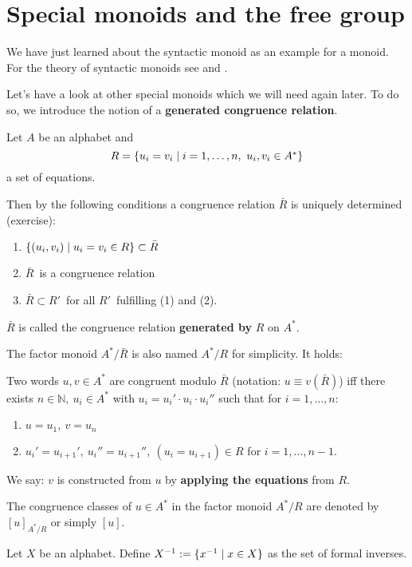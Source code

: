 \section{Special monoids and the free group}

We have just learned about the syntactic monoid as an example for a monoid. For
the theory of syntactic monoids see \cite{Salomaa} and \cite{Perrot}.

Let's have a look at other special monoids which we will need again later. To do
so, we introduce the notion of a {\bf generated congruence relation}.

Let $A$ be an alphabet and
\[ R = \mbox{$\{u_i = v_i \mid i = 1, \ldots, n,\ u_i, v_i \in A^*\}$} \] 
a set of equations.

Then by the following conditions a congruence relation $\bar{R}$ is uniquely
determined (exercise):
\begin{enumerate}
  \item $\mbox{$\{(u_i, v_i) \mid u_i = v_i \in R\}$} \subset \bar{R}$
  \item $\bar{R}$\ is a congruence relation
  \item $\bar{R} \subset R'$\ for all $R'$\ fulfilling (1) and (2).
\end{enumerate}


$\bar{R}$ is called the congruence relation {\bf generated by} $R$ on $A^*$.

The factor monoid $A^*/\bar{R}$ is also named $A^*/R$ for simplicity. It holds: 

Two words $u, v \in A^*$ are congruent modulo $\bar{R}$ (notation: $u
\equiv v (\bar{R})$) iff there exists $n \in \mathbb{N},\ u_i \in A^*$ with $u_i
= u_i' \cdot u_i \cdot u_i''$ such that for $i = 1, \ldots, n$:
\begin{enumerate}
  \item $u = u_1,\ v = u_n$
  \item $u_i' = u_{i+1}',\ u_{i}'' = u_{i+1}'',\ (u_{i} = u_{i+1}) \in R$ 
  for $i = 1, \ldots, n-1$.
\end{enumerate}

We say: $v$ is constructed from $u$ by {\bf applying the equations} from $R$.

The congruence classes of $u \in A^*$ in the factor monoid $A^*/R$ are denoted
by $[u]_{A^*/R}$ or simply $[u]$.

\begin{definition}
Let $X$ be an alphabet. Define $X^{-1} := \mbox{$\{x^{-1} \mid x \in X\}$}$ as the
set of formal inverses.
\end{definition}


